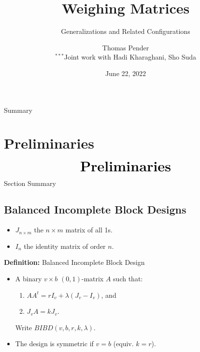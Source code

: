 \documentclass{beamer}
\title[Weighing Matrices]{Weighing Matrices}
\subtitle{Generalizations and Related Configurations}
\author[T. Pender]{Thomas Pender\\\scriptsize $^{***}$Joint work with Hadi Kharaghani, Sho Suda}
\institute[U of L]{Department of Mathematics and Computer Science\\University of
Lethbridge}
\date[06/22/2022]{June 22, 2022}
\begin{document}
{
\begin{frame}
  \titlepage
\end{frame}
}

\begin{frame}{Summary}
  \tableofcontents[hideallsubsections,sections={1-5}]
\end{frame}


\section{Preliminaries}

\begin{frame}
  \[
    \text{\huge\bf Preliminaries}
  \]
\end{frame}

\begin{frame}{Section Summary}
  \tableofcontents[sections={1}]
\end{frame}


\subsection{Balanced Incomplete Block Designs}

\begin{frame}

  \begin{itemize}
  \item $J_{n \times m}$ the $n \times m$ matrix of all 1s.
  \item $I_n$ the identity matrix of order $n$.
  \end{itemize}

  \begin{block}{{\bf Definition:} Balanced Incomplete Block Design}
    \begin{itemize}
    \item A binary $v \times b$ $(0,1)$-matrix $A$ such that:
      \begin{enumerate}
      \item $AA^t = rI_v + \lambda(J_v-I_v)$, and
      \item $J_vA = kJ_v$.
      \end{enumerate}
      Write $BIBD(v,b,r,k,\lambda)$.
    \item The design is symmetric if $v=b$ (equiv. $k=r$).
    \end{itemize}
  \end{block}

\end{frame}
\end{document}
